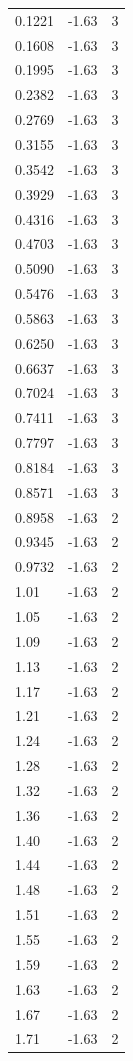 \begin{longtable}{lrr}
  0.1221 & -1.63 & 3 \\
  0.1608 & -1.63 & 3 \\
  0.1995 & -1.63 & 3 \\
  0.2382 & -1.63 & 3 \\
  0.2769 & -1.63 & 3 \\
  0.3155 & -1.63 & 3 \\
  0.3542 & -1.63 & 3 \\
  0.3929 & -1.63 & 3 \\
  0.4316 & -1.63 & 3 \\
  0.4703 & -1.63 & 3 \\
  0.5090 & -1.63 & 3 \\
  0.5476 & -1.63 & 3 \\
  0.5863 & -1.63 & 3 \\
  0.6250 & -1.63 & 3 \\
  0.6637 & -1.63 & 3 \\
  0.7024 & -1.63 & 3 \\
  0.7411 & -1.63 & 3 \\
  0.7797 & -1.63 & 3 \\
  0.8184 & -1.63 & 3 \\
  0.8571 & -1.63 & 3 \\
  0.8958 & -1.63 & 2 \\
  0.9345 & -1.63 & 2 \\
  0.9732 & -1.63 & 2 \\
  1.01 & -1.63 & 2 \\
  1.05 & -1.63 & 2 \\
  1.09 & -1.63 & 2 \\
  1.13 & -1.63 & 2 \\
  1.17 & -1.63 & 2 \\
  1.21 & -1.63 & 2 \\
  1.24 & -1.63 & 2 \\
  1.28 & -1.63 & 2 \\
  1.32 & -1.63 & 2 \\
  1.36 & -1.63 & 2 \\
  1.40 & -1.63 & 2 \\
  1.44 & -1.63 & 2 \\
  1.48 & -1.63 & 2 \\
  1.51 & -1.63 & 2 \\
  1.55 & -1.63 & 2 \\
  1.59 & -1.63 & 2 \\
  1.63 & -1.63 & 2 \\
  1.67 & -1.63 & 2 \\
  1.71 & -1.63 & 2 \\

\end{longtable}
